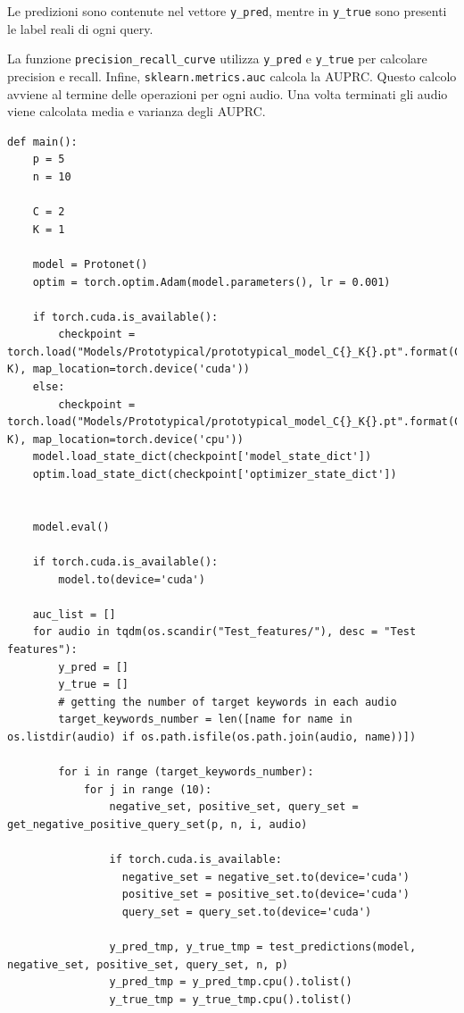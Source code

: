 \documentclass[12pt,a4paper,titlepage]{article}
\begin{document}
Le predizioni sono contenute nel vettore \texttt{y\_pred}, mentre in \texttt{y\_true} sono presenti le label reali di ogni query.

La funzione \texttt{precision\_recall\_curve} utilizza \texttt{y\_pred} e \texttt{y\_true} per calcolare precision e recall.
Infine, \texttt{sklearn.metrics.auc} calcola la AUPRC.
Questo calcolo avviene al termine delle operazioni per ogni audio.
Una volta terminati gli audio viene calcolata media e varianza degli AUPRC.

\begin{lstlisting}[language=iPython,firstnumber=77, caption=protonet\_test.py, label=protonet_test,captionpos=b]
def main():
    p = 5
    n = 10

    C = 2
    K = 1

    model = Protonet()
    optim = torch.optim.Adam(model.parameters(), lr = 0.001)

    if torch.cuda.is_available():
        checkpoint = torch.load("Models/Prototypical/prototypical_model_C{}_K{}.pt".format(C, K), map_location=torch.device('cuda'))
    else:
        checkpoint = torch.load("Models/Prototypical/prototypical_model_C{}_K{}.pt".format(C, K), map_location=torch.device('cpu'))
    model.load_state_dict(checkpoint['model_state_dict'])
    optim.load_state_dict(checkpoint['optimizer_state_dict'])


    model.eval()

    if torch.cuda.is_available():
        model.to(device='cuda')

    auc_list = []
    for audio in tqdm(os.scandir("Test_features/"), desc = "Test features"):
        y_pred = []
        y_true = []
        # getting the number of target keywords in each audio
        target_keywords_number = len([name for name in os.listdir(audio) if os.path.isfile(os.path.join(audio, name))])

        for i in range (target_keywords_number):
            for j in range (10):
                negative_set, positive_set, query_set = get_negative_positive_query_set(p, n, i, audio)  
                
                if torch.cuda.is_available:
                  negative_set = negative_set.to(device='cuda')
                  positive_set = positive_set.to(device='cuda')
                  query_set = query_set.to(device='cuda')

                y_pred_tmp, y_true_tmp = test_predictions(model, negative_set, positive_set, query_set, n, p)
                y_pred_tmp = y_pred_tmp.cpu().tolist()
                y_true_tmp = y_true_tmp.cpu().tolist()
                

\end{lstlisting}
\end{document}
